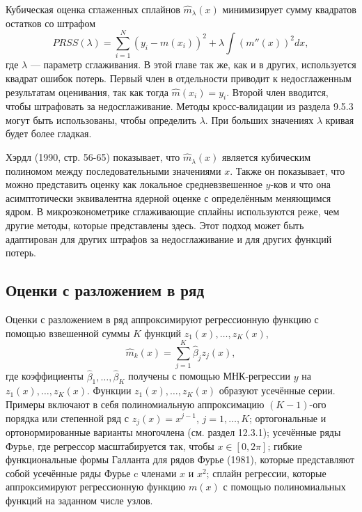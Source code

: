 Кубическая оценка сглаженных сплайнов $\hat{m}_{\lambda}(x)$ минимизирует сумму квадратов остатков со штрафом
\begin{equation}
PRSS(\lambda) = \sum_{i=1}^N (y_i - m(x_i))^2 + \lambda \int (m''(x))^2dx,
\end{equation}
где $\lambda$ --- параметр сглаживания. В этой главе так же, как и в других, используется квадрат ошибок потерь. Первый член в отдельности приводит к недосглаженным результатам оценивания, так как тогда $\hat{m}(x_i) = y_i$. Второй член вводится, чтобы штрафовать за недосглаживание. Методы кросс-валидации из раздела 9.5.3 могут быть использованы, чтобы определить $\lambda$. При больших значениях $\lambda$ кривая будет более гладкая.

Хэрдл (1990, стр. 56-65) показывает, что $\hat{m}_{\lambda}(x)$ является кубическим полиномом между последовательными значениями $x$. Также он показывает, что можно представить оценку как локальное средневзвешенное $y$-ков и что она асимптотически эквивалентна ядерной оценке с определённым меняющимся ядром. В микроэконометрике сглаживающие сплайны используются реже, чем другие методы, которые представлены здесь. Этот подход может быть адаптирован для других штрафов за недосглаживание и для других функций потерь.

\subsection{Оценки с разложением в ряд}

Оценки с разложением в ряд аппроксимируют регрессионную функцию с помощью взвешенной суммы $K$ функций $z_1(x), \dots, z_K(x)$,
\begin{equation}
\hat{m}_k(x) = \sum_{j=1}^K \hat{\beta}_j z_j(x), 
\end{equation}
где коэффициенты $\hat{\beta}_1, \dots, \hat{\beta}_K$ получены с помощью МНК-регрессии $y$ на $z_1(x), \dots, z_K(x)$. Функции $z_1(x), \dots, z_K(x)$ образуют усечённые серии. Примеры включают в себя полиномиальную аппроксимацию $(K - 1)$-ого порядка или степенной ряд с $z_j(x) = x^{j-1}$, $j = 1, \dots, K$; ортогональные и ортонормированные варианты многочлена (см. раздел 12.3.1); усечённые ряды Фурье, где регрессор масштабируется так, чтобы $x \in [0,2\pi]$; гибкие функциональные формы Галланта для рядов Фурье (1981), которые представляют собой усечённые ряды Фурье c членами $x$ и $x^2$; сплайн регрессии, которые аппроксимируют регрессионную функцию $m(x)$ с помощью полиномиальных функций на заданном числе узлов.

